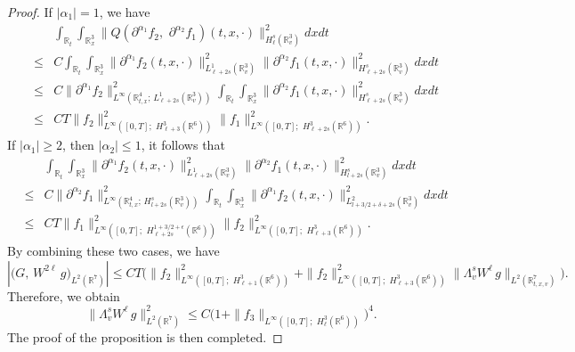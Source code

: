 \documentclass{amsart}[12pt, article]
\begin{document}
\begin{proof}
 If $|\alpha_1|=1 $, we have
\begin{eqnarray*}
&&\int_{{{{\mathbb R}}}_t}\int_{{{{\mathbb R}}}^3_x}\|Q(\partial^{\alpha_1}
{f_2},\,\,\partial^{\alpha_2} f_1)(t, x,
\cdot)\|^2_{H^s_\ell({{{\mathbb R}}}^3_v)}dx dt\\
&\leq& C\int_{{{{\mathbb R}}}_t}\int_{{{{\mathbb R}}}^3_x}\|\partial^{\alpha_1} {f_2}(t, x,
\cdot)\|^2_{L^{1}_{\ell+2s}({{{\mathbb R}}}^3_v)} \|
\partial^{\alpha_2} f_1(t, x,
\cdot)\|^2_{H^{s}_{\ell+2s}({{{\mathbb R}}}^3_v)}dx dt\\
&\leq& C\|\partial^{\alpha_1} {f_2}\|^2_{L^\infty({{{\mathbb R}}}^4_{t, x};\,
L^{1}_{\ell+2s}({{{\mathbb R}}}^3_v))} \int_{{{{\mathbb R}}}_t}\int_{{{{\mathbb R}}}^3_x} \|
\partial^{\alpha_2} f_1(t, x,
\cdot)\|^2_{H^{s}_{\ell+2s}({{{\mathbb R}}}^3_v)}dx dt\\
&\leq& C T\|f_2\|^2_{L^\infty([0, T];\,\,H^3_{\ell+3}({{{\mathbb R}}}^6))}
\|f_1\|^2_{L^\infty([0, T];\,\,H^3_{\ell+2s}({{{\mathbb R}}}^6))}.
\end{eqnarray*}
 If $|\alpha_1|\geq 2$, then $|\alpha_2|\leq
1$, it follows that
\begin{eqnarray*}
&&\int_{{{{\mathbb R}}}_t}\int_{{{{\mathbb R}}}^3_x}\|\partial^{\alpha_1} {f_2}(t, x,
\cdot)\|^2_{L^{1}_{\ell+2s}({{{\mathbb R}}}^3_v)} \|
\partial^{\alpha_2} f_1(t, x,
\cdot)\|^2_{H^{s}_{l+2s}({{{\mathbb R}}}^3_v)}dx dt\\
&\leq& C \|\partial^{\alpha_2} {f_1}\|^2_{L^\infty({{{\mathbb R}}}^4_{t,x}; \,
H^{s}_{l+2s}({{{\mathbb R}}}^3_v))} \int_{{{{\mathbb R}}}_t}\int_{{{{\mathbb R}}}^3_x} \|
\partial^{\alpha_1} f_2(t, x,
\cdot)\|^2_{L^{2}_{l+3/2+\delta+2s}({{{\mathbb R}}}^3_v)}dx dt\\
&\leq& C T\|f_1\|^2_{L^\infty([0,
T];\,\,H^{1+3/2+\epsilon}_{\ell+2s}({{{\mathbb R}}}^6))} \|f_2\|^2_{L^\infty([0,
T];\,\,H^3_{\ell+3}({{{\mathbb R}}}^6))}.
\end{eqnarray*}
By combining these two cases,  we have
\[
\left|\Big(G,\, W^{2\ell}\, g\Big)_{L^2({{{\mathbb R}}}^7)}\right|\leq C T\Big(
\|f_2\|^2_{L^\infty([0, T];\,\,H^3_{\ell+1}({{{\mathbb R}}}^6))}+
\|f_2\|^2_{L^\infty([0, T];\,\,H^3_{\ell+3}({{{\mathbb R}}}^6))} \|\Lambda^s_v
W^{\ell}\, g\|_{L^2({{{\mathbb R}}}^7_{t, x, v})} \Big).
\]
Therefore, we obtain
$$
\|\Lambda^{s}_v  W^{\ell}\, g\|^2_{L^2({{{\mathbb R}}}^7)}\leq C
\Big(1+\|{f_3}\|_{L^\infty([0, T];\,\, H^{3}_{\ell}({{{\mathbb R}}}^6))}\Big)^4.
$$
The proof of  the proposition  is then completed.
\end{proof}
\end{document}
